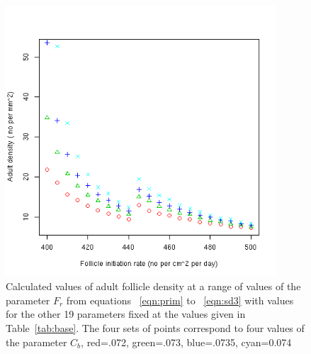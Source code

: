 %

\begin{figure}[!h]
  \centering
   \includegraphics[width=0.9\textwidth]{follinitratedens.png}
  \caption{Calculated values of adult follicle density at a range of values of the parameter $F_{r}$  from equations ~\ref{eqn:prim} to ~\ref{eqn:sd3} with values for the other 19  parameters fixed at the values given in Table~\ref{tab:base}. The four sets of points correspond to four values of the parameter $C_{b}$, red=.072, green=.073, blue=.0735, cyan=0.074}
  \label{fig:follinitratedens}
\end{figure}

%

